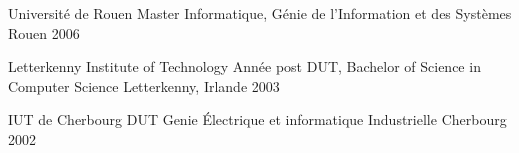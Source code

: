 

\begin{cventries}

   
  \cventry
    {Université de Rouen} %
    {Master  Informatique, Génie de l'Information et des Systèmes} %
    {Rouen} %
    {2006} %
  	{}
    
    
  \cventry
    {Letterkenny Institute of Technology} %
    {Année post DUT, Bachelor of Science in Computer Science} %
    {Letterkenny, Irlande} %
    {2003} %
  	{}


  \cventry
    {IUT de Cherbourg} %
    {DUT Genie Électrique et informatique Industrielle} %
    {Cherbourg} %
    {2002} %
  	{}

\end{cventries}


